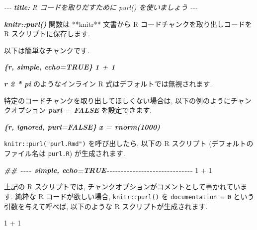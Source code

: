 \documentclass[
  11pt,
  lualatex,
  ja=standard]{bxjsreport}
\newenvironment{Shaded}{\begin{snugshade}}{\end{snugshade}}
\newcommand{\AnnotationTok}[1]{\textcolor[rgb]{0.56,0.35,0.01}{\textbf{\textit{#1}}}}
\newcommand{\CommentTok}[1]{\textcolor[rgb]{0.56,0.35,0.01}{\textit{#1}}}
\newcommand{\DecValTok}[1]{\textcolor[rgb]{0.00,0.00,0.81}{#1}}
\newcommand{\DocumentationTok}[1]{\textcolor[rgb]{0.56,0.35,0.01}{\textbf{\textit{#1}}}}
\newcommand{\InformationTok}[1]{\textcolor[rgb]{0.56,0.35,0.01}{\textbf{\textit{#1}}}}
\newcommand{\NormalTok}[1]{#1}
\newcommand{\SpecialCharTok}[1]{\textcolor[rgb]{0.00,0.00,0.00}{#1}}
\begin{document}
\begin{Shaded}
\begin{Highlighting}[]
\CommentTok{{-}{-}{-}}
\AnnotationTok{title:}\CommentTok{ R コードを取りだすために \textasciigrave{}purl()\textasciigrave{} を使いましょう}
\CommentTok{{-}{-}{-}}

\InformationTok{\textasciigrave{}knitr::purl()\textasciigrave{}}\NormalTok{ 関数は **knitr** 文書から  R コードチャンクを取り出しコードを R スクリプトに保存します.}

\NormalTok{以下は簡単なチャンクです.}

\InformationTok{\textasciigrave{}\textasciigrave{}\textasciigrave{}\{r, simple, echo=TRUE\}}
\InformationTok{1 + 1}
\InformationTok{\textasciigrave{}\textasciigrave{}\textasciigrave{}}

\InformationTok{\textasciigrave{}r 2 * pi\textasciigrave{}}\NormalTok{ のようなインライン R 式はデフォルトでは無視されます.}

\NormalTok{特定のコードチャンクを取り出してほしくない場合は, 以下の例のようにチャンクオプション }\InformationTok{\textasciigrave{}purl = FALSE\textasciigrave{}}\NormalTok{ を設定できます. }

\InformationTok{\textasciigrave{}\textasciigrave{}\textasciigrave{}\{r, ignored, purl=FALSE\}}
\InformationTok{x = rnorm(1000)}
\InformationTok{\textasciigrave{}\textasciigrave{}\textasciigrave{}}
\end{Highlighting}
\end{Shaded}

\texttt{knitr::purl("purl.Rmd")} を呼び出したら, 以下の R スクリプト (デフォルトのファイル名は \texttt{purl.R}) が生成されます.

\begin{Shaded}
\begin{Highlighting}[]
\DocumentationTok{\#\# {-}{-}{-}{-} simple, echo=TRUE{-}{-}{-}{-}{-}{-}{-}{-}{-}{-}{-}{-}{-}{-}{-}{-}{-}{-}{-}{-}{-}{-}{-}{-}{-}{-}{-}{-}{-}{-}}
\DecValTok{1} \SpecialCharTok{+} \DecValTok{1}
\end{Highlighting}
\end{Shaded}

上記の R スクリプトでは, チャンクオプションがコメントとして書かれています. 純粋な R コードが欲しい場合, \texttt{knitr::purl()} を \texttt{documentation = 0} という引数を与えて呼べば, 以下のような R スクリプトが生成されます.

\begin{Shaded}
\begin{Highlighting}[]
\DecValTok{1} \SpecialCharTok{+} \DecValTok{1}
\end{Highlighting}
\end{Shaded}
\end{document}
